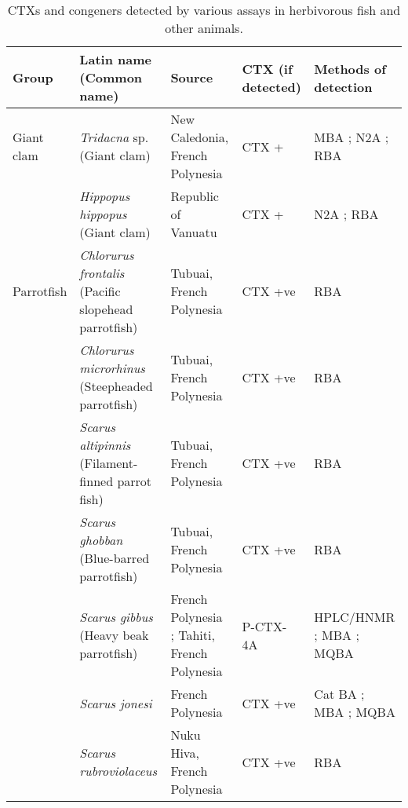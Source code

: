 \documentclass[12pt]{article}
\begin{document}
\begin{table}
\caption{CTXs and congeners detected by various assays in herbivorous fish and other animals.}
\label{tbl:HerbTable}
\begin{tabular}{| p{2cm} | p{3cm} | p{4.5cm} | p{2cm} | p{3cm} | }
\hline
\textbf{Group} & \textbf{Latin name} (Common name) & \textbf{Source} & \textbf{CTX (if detected)} & \textbf{Methods of detection} \\
\hline
 Giant clam &  \emph{Tridacna} sp. (Giant clam) & New Caledonia, French Polynesia \cite{laurent2012ciguatera} & CTX +\cite{laurent2012ciguatera} & MBA \cite{laurent2012ciguatera}; N2A \cite{laurent2012ciguatera}; RBA \cite{laurent2012ciguatera} \\
  & \emph{Hippopus hippopus} (Giant clam)  & Republic of Vanuatu \cite{laurent2012ciguatera} & CTX +\cite{laurent2012ciguatera} & N2A \cite{laurent2012ciguatera}; RBA \cite{laurent2012ciguatera} \\
  \hline
 Parrotfish & \emph{Chlorurus frontalis} (Pacific slopehead parrotfish) & Tubuai, French Polynesia \cite{darius2007ciguatera} &	CTX +ve \cite{darius2007ciguatera} & RBA \cite{darius2007ciguatera} \\
  &  \emph{Chlorurus microrhinus} (Steepheaded parrotfish) &  Tubuai, French Polynesia \cite{darius2007ciguatera} &	CTX +ve \cite{darius2007ciguatera} & RBA \cite{darius2007ciguatera} \\
  & \emph{Scarus altipinnis} (Filament-finned parrot fish) & Tubuai, French Polynesia \cite{darius2007ciguatera} &	CTX +ve \cite{darius2007ciguatera} & RBA \cite{darius2007ciguatera}  \\
  & \emph{Scarus ghobban} (Blue-barred parrotfish) & Tubuai, French Polynesia \cite{darius2007ciguatera} &	CTX +ve \cite{darius2007ciguatera} & RBA \cite{darius2007ciguatera} \\
  &  \emph{Scarus gibbus} (Heavy beak parrotfish) & French Polynesia \cite{bagnis1987use,satake1996isolation}; Tahiti, French Polynesia \cite{pompon1983ciguatera} & P-CTX-4A \cite{satake1996isolation}  & HPLC/HNMR \cite{satake1996isolation}; MBA \cite{bagnis1987use,satake1996isolation,pompon1983ciguatera}; MQBA \cite{bagnis1987use}  \\
  & \emph{Scarus jonesi} & French Polynesia \cite{bagnis1987use} & CTX +ve \cite{bagnis1987use} & Cat BA \cite{bagnis1987use}; MBA \cite{bagnis1987use}; MQBA \cite{bagnis1987use} \\
  & \emph{Scarus rubroviolaceus} &  Nuku Hiva, French Polynesia \cite{darius2007ciguatera} &	CTX +ve \cite{darius2007ciguatera} & RBA \cite{darius2007ciguatera}\\

\end{tabular}
\end{table}
\end{document}

